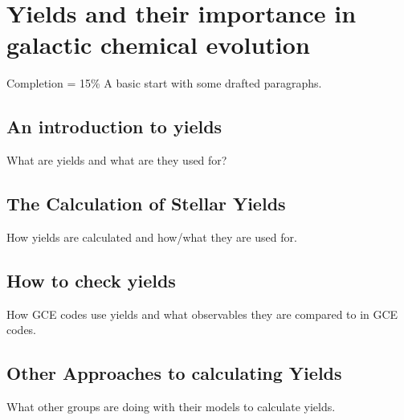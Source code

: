 \chapter{Yields and their importance in galactic chemical evolution}

Completion = 15\%
A basic start with some drafted paragraphs.

\section{An introduction to yields}

What are yields and what are they used for?

\section{The Calculation of Stellar Yields}

How yields are calculated and how/what they are used for.

\section{How to check yields}

How GCE codes use yields and what observables they are compared to in GCE codes.

\section{Other Approaches to calculating Yields}

What other groups are doing with their models to calculate yields.
